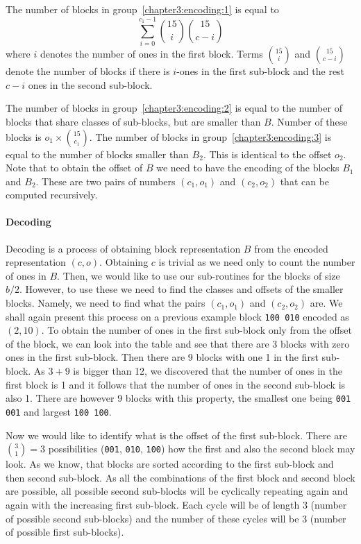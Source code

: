 The number of blocks in group~\ref{chapter3:encoding:1} is equal to
$$\sum_{i=0}^{c_1-1} {15\choose i} {15\choose c-i}$$ where $i$ denotes the number
of ones in the first block. Terms ${15\choose i}$ and ${15\choose c-i}$ denote the
number of blocks if there is $i$-ones in the first sub-block and the rest $c-i$ ones
in the second sub-block.

The number of blocks in group~\ref{chapter3:encoding:2} is equal to the number of blocks that
share classes of sub-blocks, but are smaller than $B$. Number of these blocks is $o_1\times {15\choose c_1}$.
The number of blocks in group~\ref{chapter3:encoding:3} is equal to the number of blocks smaller 
than $B_2$. This is identical to the offset $o_2$. Note that to obtain the offset of $B$
we need to have the encoding of the blocks $B_1$ and $B_2$. These are two pairs of numbers
$(c_1, o_1)$ and $(c_2, o_2)$ that can be computed recursively.

\paragraph{Decoding}

Decoding is a process of obtaining block representation $B$ from the encoded
representation $(c, o)$. Obtaining $c$ is trivial as we need only to count the number of ones in $B$. Then, we would like to use our sub-routines for the blocks
of size $b/2$. However, to use these we need to find the classes and offsets of the smaller
blocks. Namely, we need to find what the pairs $(c_1, o_1)$ and $(c_2, o_2)$ are. We shall again
present this process on a previous example block {\tt 100 010} encoded as $(2, 10)$. To obtain the
number of ones in the first sub-block only from the offset of the block, we can look into
the table and see that there are 3 blocks with zero ones in the first sub-block. Then there are 9
blocks with one 1 in the first sub-block. As $3+9$ is bigger than 12, we discovered that the number
of ones in the first block is 1 and it follows that the number of ones in the second sub-block is also 1.
There are however 9 blocks with this property, the smallest one being {\tt 001 001} and largest
{\tt 100 100}. 

Now we would like to identify what is the offset of the first sub-block. There are ${3 \choose 1} = 3$
possibilities ({\tt 001}, {\tt 010}, {\tt 100}) how the first and also the second block may look.
As we know, that blocks are sorted according to the first sub-block and then second sub-block. As
all the combinations of the first block and second block are possible, all possible second sub-blocks
will be cyclically repeating again and again with the increasing first sub-block. Each cycle will
be of length 3 (number of possible second sub-blocks) and the number of these cycles will be 3
(number of possible first sub-blocks). 

